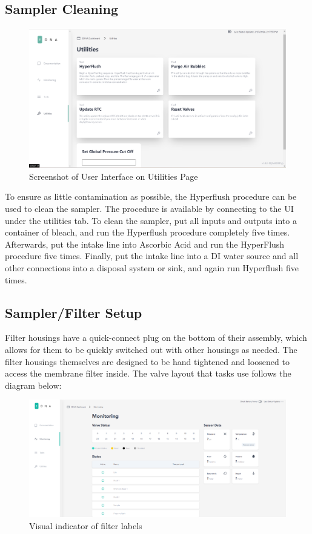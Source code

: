 \documentclass[11pt, letterpaper]{article}
\begin{document}
\subsection{Sampler Cleaning}
\begin{figure}[H]
	\centering
	\includegraphics[scale=0.35]{./Assets/UI-Utilities.png} %
	\caption{Screenshot of User Interface on Utilities Page}
\end{figure}
\par\noindent
To ensure as little contamination as possible, the Hyperflush procedure can be used to clean the sampler. The procedure is available by connecting to the UI under the utilities tab. To clean the sampler, put all inputs and outputs into a container of bleach, and run the Hyperflush procedure completely five times. Afterwards, put the intake line into Ascorbic Acid and run the HyperFlush procedure five times. Finally, put the intake line into a DI water source and all other connections into a disposal system or sink, and again run Hyperflush five times. 




\subsection{Sampler/Filter Setup}
Filter housings have a quick-connect plug on the bottom of their assembly, which allows for them to be quickly switched out with other housings as needed. The filter housings themselves are designed to be hand tightened and loosened to access the membrane filter inside. The valve layout that tasks use follows the diagram below:
 
\begin{figure}[H]
	\centering
	\includegraphics[scale=0.35]{./Assets/UI.png} %
	\caption{Visual indicator of filter labels}
\end{figure}
\end{document}

